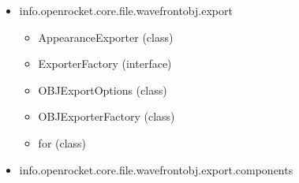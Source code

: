 \documentclass{amsdtx}
\begin{document}
\begin{itemize}
\begin{itemize}
\begin{itemize}
    \item
      Axis (enum)
    \item
      CoordTransform (class)
    \item
      DefaultCoordTransform (class) --- extends C
    \item
      DefaultFloatTuple (class) --- implements F
    \item
      DefaultMtl (class) --- implements M
    \item
      DefaultMtlWriter (class)
    \item
      DefaultObj (class) --- implements O
    \item
      DefaultObjEdge (class)
    \item
      DefaultObjFace (class) --- implements O
    \item
      DefaultObjGroup (class) --- implements O
    \item
      DefaultTextureOptions (class) --- implements T
    \item
      FloatTupleBounds (class)
    \item
      LevelOfDetail (enum)
    \item
      ObjUtils (class)
    \item
      TriangulationHelper (class)
    \item
      TriangulationMethod (enum)
    \item
      for (class)
    \item
      that (class)
    \item
      to (class)
    \item
      to (class)
    \end{itemize}
  \item
    info.openrocket.core.file.wavefrontobj.export

    \begin{itemize}
    
    \item
      AppearanceExporter (class)
    \item
      ExporterFactory (interface)
    \item
      OBJExportOptions (class)
    \item
      OBJExporterFactory (class)
    \item
      for (class)
    \end{itemize}
  \item
    info.openrocket.core.file.wavefrontobj.export.components

    \begin{itemize}
    

\end{itemize}
\end{itemize}
\end{itemize}
\end{document}
